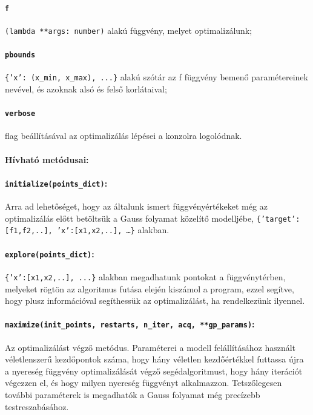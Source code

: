 \paragraph{\texttt{f}} \texttt{(lambda **args: number)} alakú függvény, melyet optimalizálunk;
\paragraph{\texttt{pbounds}} \texttt{\{'x': (x\_min, x\_max), ...\}} alakú szótár az f függvény bemenő paramétereinek nevével, és azoknak alsó és felső korlátaival;
\paragraph{\texttt{verbose}} flag beállításával az optimalizálás lépései a konzolra logolódnak.

\paragraph{Hívható metódusai:}
\paragraph{\texttt{initialize(points\_dict)}:} Arra ad lehetőséget, hogy az általunk ismert függvényértékeket még az optimalizálás előtt betöltsük a Gauss folyamat közelítő modelljébe, \texttt{\{'target': [f1,f2,..], 'x':[x1,x2,..], \dots\}} alakban.
\paragraph{\texttt{explore(points\_dict)}:} \texttt{\{'x':[x1,x2,..], ...\}} alakban megadhatunk pontokat a függvénytérben, melyeket rögtön az algoritmus futása elején kiszámol a program, ezzel segítve, hogy plusz információval segíthessük az optimalizálást, ha rendelkezünk ilyennel. 
\paragraph{\texttt{maximize(init\_points, restarts, n\_iter, acq, **gp\_params)}:} Az optimalizálást végző metódus. Paraméterei a modell felállításához használt véletlenszerű kezdőpontok száma, hogy hány véletlen kezdőértékkel futtassa újra a nyereség függvény optimalizálását végző segédalgoritmust, hogy hány iterációt végezzen el, és hogy milyen nyereség függvényt alkalmazzon. Tetszőlegesen további paraméterek is megadhatók a Gauss folyamat még precízebb testreszabásához.\\


